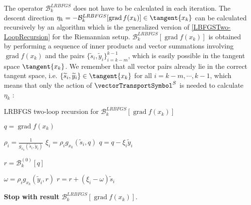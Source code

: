 The operator $\mathcal{B}^{LRBFGS}_k$ does not have to be calculated in each iteration. The descent direction $\eta_k = - \mathcal{B}^{LRBFGS}_k[\operatorname{grad} f(x_k)] \in \tangent{x_k}$ can be calculated recursively by an algorithm which is the generalized version of \cref{LBFGSTwo-LoopRecursion} for the Riemannian setup. $\mathcal{B}^{LRBFGS}_k[\operatorname{grad} f(x_k)]$ is obtained by performing a sequence of inner products and vector summations involving $\operatorname{grad} f(x_k)$ and the pairs $\{ \widetilde{s}_i, \widetilde{y}_i\}_{i=k-m}^{k-1}$, which is easily possible in the tangent space $\tangent{x_k}$. We remember that all vector pairs already lie in the correct tangent space, i.e. $\{ \widetilde{s}_i, \widetilde{y}_i \} \in \tangent{x_k}$ for all $i = k-m, \cdots, k-1$, which means that only the action of $\vectorTransportSymbol^S$ is needed to calculate $\eta_k$ \cite[p.~1676]{HuangGallivanAbsil:2015}:

\begin{algorithm}[H]
	\caption{LRBFGS two-loop recursion for $\mathcal{B}^{LRBFGS}_k[\operatorname{grad} f(x_k)]$} \label{LRBFGSTwo-LoopRecursion}
	\begin{algorithmic}[1]
        \State $q = \operatorname{grad} f(x_k)$
        
            \State $\rho_i = \frac{1}{g_{x_k}(\widetilde{s}_i, \widetilde{y}_i)}$
            \State $\xi_i = \rho_i g_{x_k}(\widetilde{s}_i, q)$ 
            \State $q = q - \xi_i \widetilde{y}_i$
        \EndFor

        \State $r = \mathcal{B}^{(0)}_k[q]$
        
            \State $\omega = \rho_i g_{x_k}(\widetilde{y}_i, r)$ 
            \State $r= r  + (\xi_i - \omega) \widetilde{s}_i$
		\EndFor
		
		\State \textbf{Stop with result} $\mathcal{B}^{LRBFGS}_k[\operatorname{grad} f(x_k)]$.
    \end{algorithmic}
\end{algorithm}

